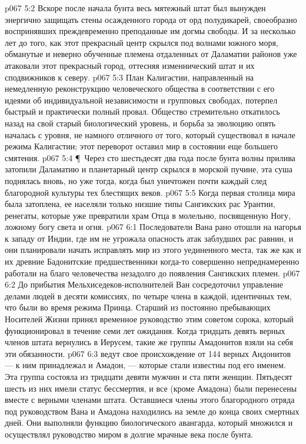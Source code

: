 \vs p067 5:2 Вскоре после начала бунта весь мятежный штат был вынужден энергично защищать стены осажденного города от орд полудикарей, своеобразно воспринявших преждевременно преподанные им догмы свободы. И за несколько лет до того, как этот прекрасный центр скрылся под волнами южного моря, обманутые и неверно обученные племена отдаленных от Даламатии районов уже атаковали этот прекрасный город, оттесняя изменнический штат и их сподвижников к северу.
\vs p067 5:3 План Калигастии, направленный на немедленную реконструкцию человеческого общества в соответствии с его идеями об индивидуальной независимости и групповых свободах, потерпел быстрый и практически полный провал. Общество стремительно откатилось назад на свой старый биологический уровень, и борьба за эволюцию опять началась с уровня, не намного отличного от того, который существовал в начале режима Калигастии; этот переворот оставил мир в состоянии еще большего смятения.
\vs p067 5:4 \P\ Через сто шестьдесят два года после бунта волны прилива затопили Даламатию и планетарный центр скрылся в морской пучине, эта суша поднялась вновь, но уже тогда, когда был уничтожен почти каждый след благородной культуры тех блестящих веков.
\vs p067 5:5 Когда первая столица мира была затоплена, ее населяли только низшие типы Сангикских рас Урантии, ренегаты, которые уже превратили храм Отца в молельню, посвященную Ногу, ложному богу света и огня.
\vs p067 6:1 Последователи Вана рано отошли на нагорья к западу от Индии, где им не угрожала опасность атак заблудших рас равнин, и они планировали начать исправлять мир из этого уединенного места, так же как и их древние Бадонитские предшественники когда\hyp{}то совершенно непреднамеренно работали на благо человечества незадолго до появления Сангикских племен.
\vs p067 6:2 До прибытия Мельхиседеков\hyp{}исполнителей Ван сосредоточил управление делами людей в десяти комиссиях, по четыре члена в каждой, идентичных тем, что были во время режима Принца. Старший из постоянно пребывающих Носителей Жизни принял временное руководство этим советом сорока, который функционировал в течение семи лет ожидания. Когда тридцать девять верных членов штата вернулись в Иерусем, такие же группы Амадонитов взяли на себя эти обязанности.
\vs p067 6:3  ведут свое происхождение от 144 верных Андонитов --- к ним принадлежал и Амадон, --- которые стали известны под его именем. Эта группа состояла из тридцати девяти мужчин и ста пяти женщин. Пятьдесят шесть из них имели статус бессмертия, и все (кроме Амадона) были перенесены вместе с верными членами штата. Оставшиеся члены этого благородного отряда под руководством Вана и Амадона находились на земле до конца своих смертных дней. Они выполняли функцию биологического авангарда, который множился и осуществлял руководство миром в долгие мрачные века после бунта.
